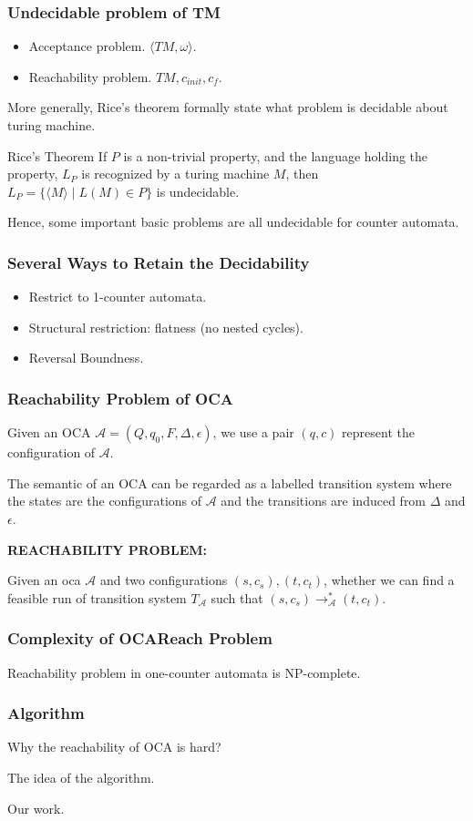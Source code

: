 \documentclass[11pt]{beamer}
\begin{document}
\begin{frame}\frametitle{Undecidable problem of TM}
\begin{itemize}
\item Acceptance problem. $\langle TM, \omega\rangle$.
\item Reachability problem. $TM, c_{init}, c_{f}$.

\end{itemize}
More generally, Rice's theorem formally state what problem is decidable about turing machine.

\begin{theorem}{Rice's Theorem}
If $P$ is a non-trivial property, and the language holding the property, $L_P$ is recognized by a turing machine $M$, then $L_P = \{\langle M\rangle\mid L(M) \in P\}$ is undecidable.
\end{theorem}


Hence, some important basic problems are all undecidable for counter automata.
\end{frame}


\begin{frame}\frametitle{Several Ways to Retain the Decidability}
\begin{itemize}
\item Restrict to 1-counter automata.

\item Structural restriction: flatness (no nested cycles).

\item Reversal Boundness.
\end{itemize}
\end{frame}


\begin{frame}\frametitle{Reachability Problem of OCA}

\begin{definition}
Given an OCA $\mathcal{A} = (Q, q_0, F, \Delta, \epsilon)$, we use a pair $(q, c)$ represent the configuration of $\mathcal{A}$.

\end{definition}

The semantic of an OCA can be regarded as a labelled transition system where the states are the configurations of $\mathcal{A}$ and the transitions are induced from $\Delta$ and $\epsilon$.


\textbf{REACHABILITY PROBLEM:}

Given an oca $\mathcal{A}$ and two configurations $(s, c_s), (t, c_t)$, whether we can find a feasible run of transition system $T_{\mathcal{A}}$ such that $(s,c_s)\rightarrow_{\mathcal{A}}^*(t,c_t)$.


\end{frame}


\begin{frame}\frametitle{Complexity of OCAReach Problem}

\begin{theorem}
Reachability problem in one-counter automata is NP-complete.
\end{theorem}

\end{frame}

\begin{frame}\frametitle{Algorithm}
Why the reachability of OCA is hard?

The idea of the algorithm.

Our work.
\end{frame}
\end{document}
